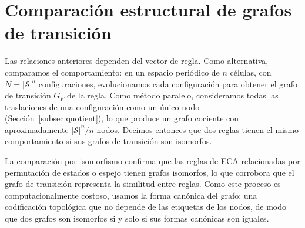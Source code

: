 \section{Comparación estructural de grafos de transición}
\label{sec:structural}

Las relaciones anteriores dependen del vector de regla. Como alternativa, comparamos el comportamiento: en un espacio periódico de $n$ células, con $N = |\mathcal{S}|^n$ configuraciones, evolucionamos cada configuración para obtener el grafo de transición $G_F$ de la regla. Como método paralelo, consideramos todas las traslaciones de una configuración como un único nodo (Sección~\ref{subsec:quotient}), lo que produce un grafo cociente con aproximadamente $|\mathcal{S}|^n / n$ nodos. Decimos entonces que dos reglas tienen el mismo comportamiento si sus grafos de transición son isomorfos.

La comparación por isomorfismo confirma que las reglas de ECA relacionadas por permutación de estados o espejo tienen grafos isomorfos, lo que corrobora que el grafo de transición representa la similitud entre reglas. Como este proceso es computacionalmente costoso, usamos la forma canónica del grafo: una codificación topológica que no depende de las etiquetas de los nodos, de modo que dos grafos son isomorfos si y solo si sus formas canónicas son iguales.

